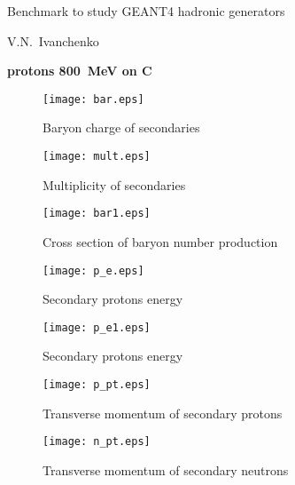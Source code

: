 \documentclass[12pt]{article}
\begin{document}
\pagestyle{empty}

\begin{center}
{\large Benchmark to study GEANT4 hadronic generators} 

\vspace*{5mm}
V.N.~Ivanchenko

\vspace*{5mm}


\vspace*{5mm}

{\bf protons 800~MeV on C} 

\vspace*{5mm}


\end{center}


\begin{figure}[htbp]
\caption{Baryon charge of secondaries}
\label{fig1}  
\centerline{\texttt{[image: bar.eps]}}
\end{figure}
\begin{figure}[htbp]
\caption{Multiplicity of secondaries}
\label{fig1a}  
\centerline{\texttt{[image: mult.eps]}}
\end{figure}
\begin{figure}[htbp]
\caption{Cross section of baryon number production}
\label{fig1b}  
\centerline{\texttt{[image: bar1.eps]}}
\end{figure}

\begin{figure}[htbp]
\caption{Secondary protons energy}
\label{fig2} 
\centerline{\texttt{[image: p\_e.eps]}}
\end{figure}
\begin{figure}[htbp]
\caption{Secondary protons energy}
\label{fig2a} 
\centerline{\texttt{[image: p\_e1.eps]}}
\end{figure}

\newpage

\begin{figure}[htbp]
\caption{Transverse momentum of secondary protons} 
\label{fig3}
\centerline{\texttt{[image: p\_pt.eps]}}
\end{figure}

\newpage

\begin{figure}[htbp]
\caption{Transverse momentum of secondary neutrons} 
\label{fig4}
\centerline{\texttt{[image: n\_pt.eps]}}
\end{figure}
\end{document}
